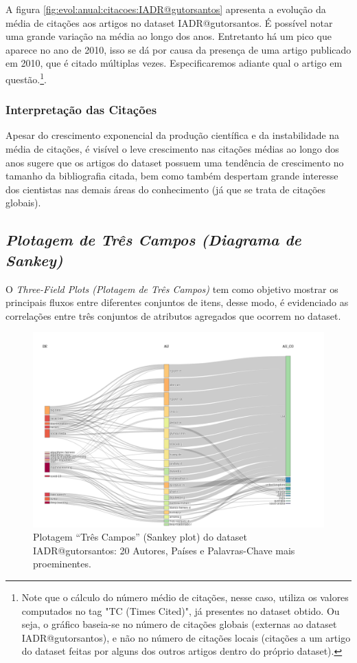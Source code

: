 A figura \ref{fig:evol:anual:citacoes:IADR@gutorsantos} apresenta a evolução da média de citações aos \totalDocuments{} artigos no dataset IADR@gutorsantos. 
É possível notar uma grande variação na média ao longo dos anos. Entretanto há um pico que aparece no ano de 2010, isso se dá por causa da presença de uma artigo publicado em 2010, que é citado múltiplas vezes. Especificaremos adiante qual o artigo em questão.\footnote{Note que o cálculo do número  médio de citações, nesse caso, utiliza os valores computados no tag "TC (Times Cited)", já presentes no dataset obtido. Ou seja, o gráfico baseia-se no número de citações globais (externas ao dataset IADR@gutorsantos), e não no número de citações locais (citações a um artigo do dataset feitas por alguns dos outros artigos dentro do próprio dataset).}.

\subsubsection{Interpretação das Citações}
Apesar do crescimento exponencial da produção científica e da instabilidade na média de citações, é visível o leve crescimento nas citações médias ao longo dos anos sugere que os artigos do dataset possuem uma tendência de crescimento no tamanho da bibliografia citada, bem como também despertam grande interesse dos cientistas nas demais áreas do conhecimento (já que se trata de citações globais).

\subsection{\textit{Plotagem de Três Campos (Diagrama de Sankey)}}

O \textit{Three-Field Plots (Plotagem de Três Campos)} tem como objetivo mostrar os principais fluxos entre diferentes conjuntos de itens, desse modo, é evidenciado as correlações entre três conjuntos de atributos agregados que ocorrem no dataset.

\begin{figure}[H]
    \centering
    \includegraphics[angle=0,width=1\textwidth]{experiments/gutorsantos/AnaliseBibliometrica/IAeDiscriminacao/imgs/ThreeFieldPlot.png}
    \caption{Plotagem ``Três Campos'' (Sankey plot) do dataset IADR@gutorsantos: 20 Autores, Países e Palavras-Chave mais proeminentes.}
    \label{fig:IADR@gutorsantos:ThreeFieldPlot}
\end{figure}

